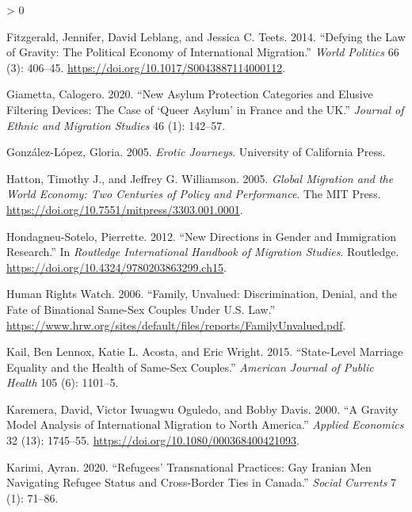 \documentclass[
  11pt,
]{article}
\newlength{\cslhangindent}
\newenvironment{CSLReferences}[2] %
 {%
  \setlength{\parindent}{0pt}
  \ifodd #1 \everypar{\setlength{\hangindent}{\cslhangindent}}\ignorespaces\fi
  \ifnum #2 > 0
  \setlength{\parskip}{#2\baselineskip}
  \fi
 }%
 {}
\begin{document}
\begin{CSLReferences}{1}{0}
\leavevmode\hypertarget{ref-fitzgerald_2014}{}%
Fitzgerald, Jennifer, David Leblang, and Jessica C. Teets. 2014. {``Defying the {Law} of {Gravity}: {The} {Political} {Economy} of {International} {Migration}.''} \emph{World Politics} 66 (3): 406--45. \url{https://doi.org/10.1017/S0043887114000112}.

\leavevmode\hypertarget{ref-giametta_2020}{}%
Giametta, Calogero. 2020. {``New Asylum Protection Categories and Elusive Filtering Devices: The Case of {`{Queer} Asylum'} in {France} and the {UK}.''} \emph{Journal of Ethnic and Migration Studies} 46 (1): 142--57.

\leavevmode\hypertarget{ref-gonzalez-lopez_2005}{}%
González-López, Gloria. 2005. \emph{Erotic {Journeys}}. University of California Press.

\leavevmode\hypertarget{ref-hatton_2005a}{}%
Hatton, Timothy J., and Jeffrey G. Williamson. 2005. \emph{Global {Migration} and the {World} {Economy}: {Two} {Centuries} of {Policy} and {Performance}}. The MIT Press. \url{https://doi.org/10.7551/mitpress/3303.001.0001}.

\leavevmode\hypertarget{ref-hondagneu-sotelo_2012}{}%
Hondagneu-Sotelo, Pierrette. 2012. {``New Directions in Gender and Immigration Research.''} In \emph{Routledge {International} {Handbook} of {Migration} {Studies}}. Routledge. \url{https://doi.org/10.4324/9780203863299.ch15}.

\leavevmode\hypertarget{ref-humanrightswatch_2006}{}%
Human Rights Watch. 2006. {``Family, {Unvalued}: {Discrimination}, {Denial}, and the {Fate} of {Binational} {Same}-{Sex} {Couples} Under {U}.{S}. {Law}.''} \url{https://www.hrw.org/sites/default/files/reports/FamilyUnvalued.pdf}.

\leavevmode\hypertarget{ref-kail_2015}{}%
Kail, Ben Lennox, Katie L. Acosta, and Eric Wright. 2015. {``State-Level Marriage Equality and the Health of Same-Sex Couples.''} \emph{American Journal of Public Health} 105 (6): 1101--5.

\leavevmode\hypertarget{ref-karemera_2000}{}%
Karemera, David, Victor Iwuagwu Oguledo, and Bobby Davis. 2000. {``A Gravity Model Analysis of International Migration to {North} {America}.''} \emph{Applied Economics} 32 (13): 1745--55. \url{https://doi.org/10.1080/000368400421093}.

\leavevmode\hypertarget{ref-karimi_2020}{}%
Karimi, Ayran. 2020. {``Refugees' {Transnational} {Practices}: {Gay} {Iranian} {Men} {Navigating} {Refugee} {Status} and {Cross}-Border {Ties} in {Canada}.''} \emph{Social Currents} 7 (1): 71--86.


\end{CSLReferences}
\end{document}
